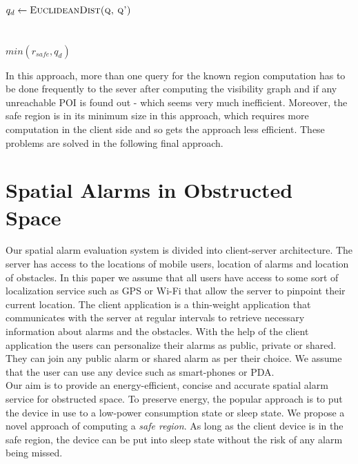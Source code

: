 \documentclass{sig-alternate}
\begin{document}
\begin{algorithm}
\begin{algorithmic}[1]
\\

    \\
    \\$q_d \gets \textsc{EuclideanDist(q, q')}$
    \\
    \\
    \\
    \Return $min( r_{safe}, q_d )$
\EndProcedure
\end{algorithmic}
\end{algorithm}

In this approach, more than one query for the known region computation has to be done frequently to the sever after computing the visibility graph and if any unreachable POI is found out - which seems very much inefficient. Moreover, the safe region is in its minimum size in this approach, which requires more computation in the client side and so gets the approach less efficient. These problems are solved in the following final approach.


\section{Spatial Alarms in Obstructed Space}
Our spatial alarm evaluation system is divided into client-server architecture. The server has access to the locations of mobile users, location of alarms and location of obstacles. In this paper we assume that all users have access to some sort of localization service such as GPS or Wi-Fi that allow the server to pinpoint their current location. The client application is a thin-weight application that communicates with the server at regular intervals to retrieve necessary information about alarms and the obstacles. With the help of the client application the users can personalize their alarms as public, private or shared. They can join any public alarm or shared alarm as per their choice. We assume that the user can use any device such as smart-phones or PDA.\\ Our aim is to provide an energy-efficient, concise and accurate spatial alarm service for obstructed space. To preserve energy, the popular approach is to put the device in use to a low-power consumption state or sleep state. We propose a novel approach of computing a \textit{safe region}. As long as the client device is in the safe region, the device can be put into sleep state without the risk of any alarm being missed. \\
\end{document}
